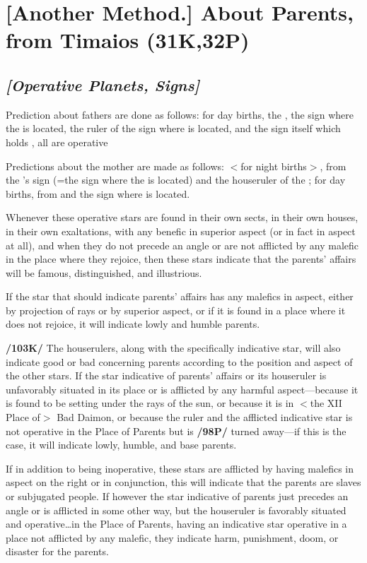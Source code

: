 \section{[Another Method.] About Parents, from Timaios (31K,32P)}

\subsection{\textit{[Operative Planets, Signs]}}
Prediction about fathers are done as follows: for day births, the \Sun, the sign where the \Sun\xspace is located, the ruler of the sign where \Jupiter\xspace is located, and the sign itself which holds \Jupiter, all are operative

Predictions about the mother are made as follows: $<$for night births$>$, from the \Moon’s sign (=the sign where the \Moon\xspace is located) and the houseruler of the \Moon; for day births, from \Venus\xspace and the sign where \Venus\xspace is located. 

Whenever these operative stars are found in their own sects, in their own houses, in their own exaltations, with any benefic in superior aspect (or in fact in aspect at all), and when they do not precede an angle or are not afflicted by any malefic in the place where they rejoice, then these stars indicate that the parents’ affairs will be famous, distinguished, and illustrious. 

If the star that should indicate parents’ affairs has any malefics in aspect, either by projection of rays or by superior aspect, or if it is found in a place where it does not rejoice, it will indicate lowly and humble parents.

\textbf{/103K/} The houserulers, along with the specifically indicative star, will also indicate good or bad concerning parents according to the position and aspect of the other stars. If the star indicative of parents’ affairs or its houseruler is unfavorably situated in its place or is afflicted by any harmful aspect—because it is found to be setting under the rays of the sun, or because it is in $<$the XII Place of$>$ Bad Daimon, or because the ruler and the afflicted indicative star is not operative in the Place of Parents but is \textbf{/98P/} turned away—if this is the case, it will indicate lowly, humble, and base parents. 

If in addition to being inoperative, these stars are afflicted by having malefics in aspect on the right or in conjunction, this will indicate that the parents are slaves or subjugated people. If however the star indicative of parents just precedes an angle or is afflicted in some other way, but the houseruler is favorably situated and operative\ldots in the Place of Parents, having an indicative star operative in a place not afflicted by any malefic, they indicate harm, punishment, doom, or disaster for the parents. 


